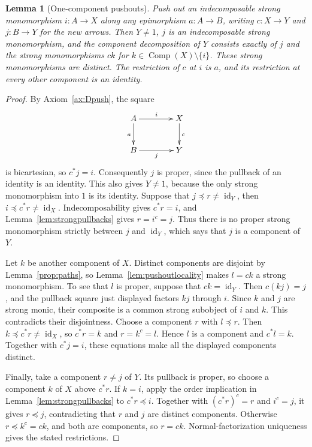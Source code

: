 \documentclass[11pt,a4paper]{article}
\theoremstyle{plain}
\newtheorem{lemma}[theorem]{Lemma}
\theoremstyle{definition}
\theoremstyle{remark}
\newcommand{\one}{1}
\newcommand{\id}{\operatorname{id}}
\newcommand{\Comp}{\operatorname{Comp}}
\newcommand{\inside}{\mathrel{\preceq}}
\begin{document}
\begin{lemma}[One-component pushouts]\label{lem:componentpushout}
Push out an indecomposable strong monomorphism $i:A\to X$ along any epimorphism
$a:A\to B$, writing $c:X\to Y$ and $j:B\to Y$ for the new arrows.
Then $Y\ne\one$, $j$ is an indecomposable strong monomorphism, and the component
decomposition of $Y$ consists exactly of $j$ and the strong monomorphisms
$ck$ for $k\in\Comp(X)\setminus\{i\}$. These strong monomorphisms are
distinct. The restriction of $c$ at $i$ is $a$, and its restriction
at every other component is an identity.
\end{lemma}
\begin{proof}
By Axiom~\ref{ax:Dpush}, the square
\[
 \xymatrix@C=4em@R=2.5em{
A\ar[r]^i\ar[d]_a&X\ar[d]^c\\
B\ar[r]_j&Y
 }
\]
is bicartesian, so $c^*j=i$. Consequently $j$ is proper, since
the pullback of an identity is an identity. This also gives
$Y\ne\one$, because the only strong monomorphism into $\one$
is its identity. Suppose that
$j\inside r\ne\id_Y$, then
$i\inside c^*r\ne\id_X$. Indecomposability gives $c^*r=i$, and
Lemma~\ref{lem:strongpullbacks} gives $r=i^c=j$.
Thus there is no proper strong monomorphism strictly between $j$
and $\id_Y$, which says that $j$ is a component of $Y$.

Let $k$ be another component of $X$. Distinct components are disjoint
by Lemma~\ref{prop:paths}, so Lemma~\ref{lem:pushoutlocality}
makes $l=ck$ a strong monomorphism. To see that $l$ is proper,
suppose that $ck=\id_Y$. Then $c(kj)=j$, and the pullback square
just displayed factors $kj$ through $i$. Since $k$ and $j$ are
strong monic, their composite is a common strong subobject of $i$
and $k$. This contradicts their disjointness.
Choose a component $r$ with $l\inside r$. Then
$k\inside c^*r\ne\id_X$, so $c^*r=k$ and $r=k^c=l$.
Hence $l$ is a component and $c^*l=k$.
Together with $c^*j=i$, these equations make all the displayed
components distinct.

Finally, take a component $r\ne j$ of $Y$. Its pullback is proper,
so choose a component $k$ of $X$ above $c^*r$. If $k=i$, apply the order implication in
Lemma~\ref{lem:strongpullbacks} to $c^*r\inside i$. Together
with $(c^*r)^c=r$ and $i^c=j$, it gives $r\inside j$,
contradicting that $r$ and $j$ are distinct components. Otherwise
$r\inside k^c=ck$, and both are components, so $r=ck$.
Normal-factorization uniqueness gives the stated restrictions.
\end{proof}
\end{document}
